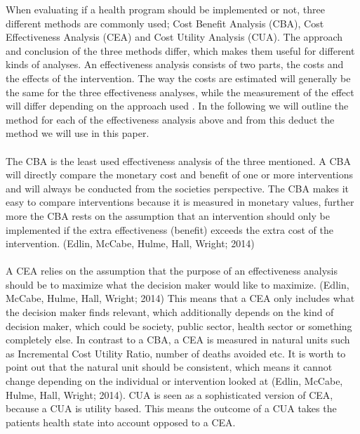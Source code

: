 \documentclass[a4paper,12pt]{article}
\begin{document}
When evaluating if a health program should be implemented or not, three different methods are commonly used; Cost Benefit Analysis (CBA), Cost Effectiveness Analysis (CEA) and Cost Utility Analysis (CUA). The approach and conclusion of the three methods differ, which makes them useful for different kinds of analyses. An effectiveness analysis consists of two parts, the costs and the effects of the intervention. The way the costs are estimated will generally be the same for the three effectiveness analyses, while the measurement of the effect will differ depending on the approach used \cite{Christiansen2010}. In the following we will outline the method for each of the effectiveness analysis above and from this deduct the method we will use in this paper.  
\\\\
The CBA is the least used effectiveness analysis of the three mentioned. A CBA will directly compare the monetary cost and benefit of one or more interventions and will always be conducted from the societies perspective. The CBA makes it easy to compare interventions because it is measured in monetary values, further more the CBA rests on the assumption that an intervention should only be implemented if the extra effectiveness (benefit) exceeds the extra cost of the intervention. (Edlin, McCabe, Hulme, Hall, Wright; 2014)
\\\\
A CEA relies on the assumption that the purpose of an effectiveness analysis should be to maximize what the decision maker would like to maximize. (Edlin, McCabe, Hulme, Hall, Wright; 2014) This means that a CEA only includes what the decision maker finds relevant, which additionally depends on the kind of decision maker, which could be society, public sector, health sector or something completely else. In contrast to a CBA, a CEA is measured in natural units such as Incremental Cost Utility Ratio, number of deaths avoided etc. It is worth to point out that the natural unit should be consistent, which means it cannot change depending on the individual or intervention looked at (Edlin, McCabe, Hulme, Hall, Wright; 2014). CUA is seen as a sophisticated version of CEA, because a CUA is utility based. This means the outcome of a CUA takes the patients health state into account opposed to a CEA. 
\end{document}
